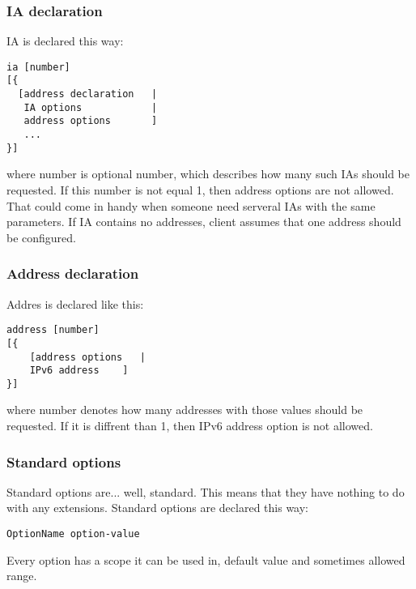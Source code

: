 \subsubsection{IA declaration}

IA is declared this way:

\begin{verbatim}
ia [number]
[{ 
  [address declaration   | 
   IA options            | 
   address options       ] 
   ...          
}]
\end{verbatim}

where number is optional number, which describes how many such IAs
should be requested. If this number is not equal 1, then address
options are not allowed. That could come in handy when someone need
serveral IAs with the same parameters. If IA contains no addresses,
client assumes that one address should be configured.


\subsubsection{Address declaration}
Addres is declared like this:

\begin{verbatim}
address [number] 
[{ 
	[address options   |
	IPv6 address    ] 
}]
\end{verbatim}
where number denotes how many addresses with those values should be
requested. If it is diffrent than 1, then IPv6 address option is not
allowed.

\subsubsection{Standard options}
Standard options are... well, standard. This means that they have 
nothing to do with any extensions. Standard options are declared this way:

\begin{verbatim}
OptionName option-value
\end{verbatim}

Every option has a scope it can be used in, default value and
sometimes allowed range.

